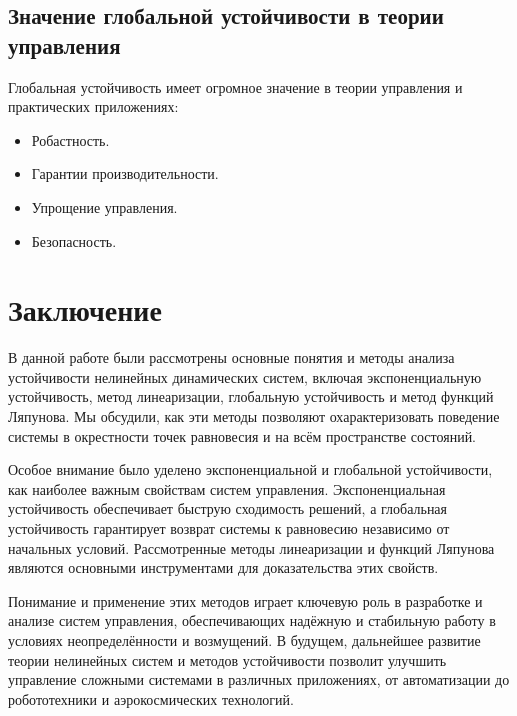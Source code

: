 \documentclass[a4paper,14pt]{extarticle} %
\begin{document}
\subsection{Значение глобальной устойчивости в теории управления}

Глобальная устойчивость имеет огромное значение в теории управления и практических приложениях:
\begin{itemize}
    \item Робастность.
    \item Гарантии производительности.
    \item Упрощение управления.
    \item Безопасность.
\end{itemize}


\section{Заключение}

В данной работе были рассмотрены основные понятия и методы анализа устойчивости нелинейных динамических систем, включая экспоненциальную устойчивость, метод линеаризации, глобальную устойчивость и метод функций Ляпунова. Мы обсудили, как эти методы позволяют охарактеризовать поведение системы в окрестности точек равновесия и на всём пространстве состояний.

Особое внимание было уделено экспоненциальной и глобальной устойчивости, как наиболее важным свойствам систем управления. Экспоненциальная устойчивость обеспечивает быструю сходимость решений, а глобальная устойчивость гарантирует возврат системы к равновесию независимо от начальных условий. Рассмотренные методы линеаризации и функций Ляпунова являются основными инструментами для доказательства этих свойств.

Понимание и применение этих методов играет ключевую роль в разработке и анализе систем управления, обеспечивающих надёжную и стабильную работу в условиях неопределённости и возмущений. В будущем, дальнейшее развитие теории нелинейных систем и методов устойчивости позволит улучшить управление сложными системами в различных приложениях, от автоматизации до робототехники и аэрокосмических технологий.
\end{document}
